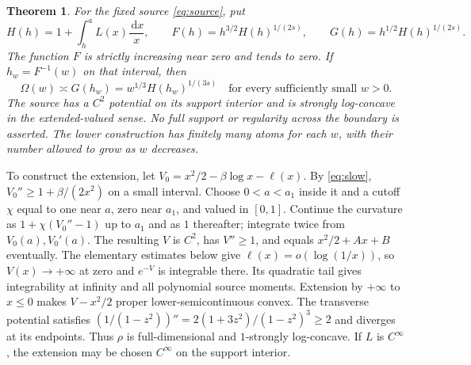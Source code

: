 \documentclass[11pt]{article}
\newtheorem{theorem}{Theorem}
\theoremstyle{remark}\newtheorem{remark}[theorem]{Remark}
\newcommand{\dd}{\,\mathrm d}
\begin{document}
\begin{theorem}\label{thm:main}
For the fixed source \eqref{eq:source}, put
\begin{equation}\label{eq:scales}
 H(h)=1+\int_h^a L(x)\frac{\dd x}{x},\qquad
 F(h)=h^{3/2}H(h)^{1/(2s)},\qquad
 G(h)=h^{1/2}H(h)^{1/(2s)}.
\end{equation}
The function $F$ is strictly increasing near zero and tends to zero. If $h_w=F^{-1}(w)$ on that interval, then
\begin{equation}\label{eq:modulus}
 \Omega(w)\asymp G(h_w)
       =w^{1/3}H(h_w)^{1/(3s)}
 \quad\text{for every sufficiently small }w>0.
\end{equation}
The source has a $C^2$ potential on its support interior and is strongly log-concave in the extended-valued sense. No full support or regularity across the boundary is asserted. The lower construction has finitely many atoms for each $w$, with their number allowed to grow as $w$ decreases.
\end{theorem}

To construct the extension, let $V_0=x^2/2-\beta\log x-\ell(x)$. By \eqref{eq:slow}, $V_0''\ge1+\beta/(2x^2)$ on a small interval. Choose $0<a<a_1$ inside it and a cutoff $\chi$ equal to one near $a$, zero near $a_1$, and valued in $[0,1]$. Continue the curvature as $1+\chi(V_0''-1)$ up to $a_1$ and as $1$ thereafter; integrate twice from $V_0(a),V_0'(a)$. The resulting $V$ is $C^2$, has $V''\ge1$, and equals $x^2/2+Ax+B$ eventually. The elementary estimates below give $\ell(x)=o(\log(1/x))$, so $V(x)\to+\infty$ at zero and $e^{-V}$ is integrable there. Its quadratic tail gives integrability at infinity and all polynomial source moments. Extension by $+\infty$ to $x\le0$ makes $V-x^2/2$ proper lower-semicontinuous convex. The transverse potential satisfies
$(1/(1-z^2))''=2(1+3z^2)/(1-z^2)^3\ge2$ and diverges at its endpoints. Thus $\rho$ is full-dimensional and $1$-strongly log-concave. If $L$ is $C^\infty$, the extension may be chosen $C^\infty$ on the support interior.
\end{document}
